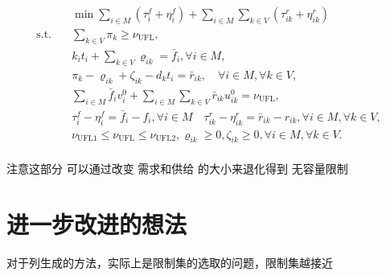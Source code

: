 \documentclass[UTF8]{article}
\begin{document}
\begin{equation}
\begin{aligned}
&\min \sum_{i \in M} \left(\tau_{i}^{f}+\eta_{i}^{f}\right)+\sum_{i \in M} \sum_{k \in V} \left(\tau_{i k}^r+\eta_{i k}^{r}\right) \\
\text{s.t.} \quad &\sum_{k \in V} \pi_{k} \geq \nu_{\mathrm{UFL}}, \\
&k_it_i+\sum_{k \in V} \varrho_{i k}=\bar{f}_{i}, \forall i \in M, \\
&\pi_{k}-\varrho_{i k}+\zeta_{i k}-d_kt_i=\bar{r}_{i k}, \quad \forall i \in M, \forall k \in V, \\
&\sum_{i \in M} \bar{f}_{i} v_{i}^{0}+\sum_{i \in M} \sum_{k \in V} \bar{r}_{i k} u_{i k}^{0}=\nu_{\mathrm{UFL}}, \\
& \tau_{i}^{f}-\eta_{i}^{f}=\bar{f}_{i}-f_{i}, \forall i \in M \quad \tau_{i k}^{r}-\eta_{i k}^{r}=\bar{r}_{i k}-r_{i k}, \forall i \in M, \forall k \in V, \\
&\nu_{\mathrm{UFL} 1} \leq \nu_{\mathrm{UFL}} \leq \nu_{\mathrm{UFL} 2}, \varrho_{i k} \geq 0, \zeta_{i k} \geq 0, \forall i \in M, \forall k \in V. \\
\end{aligned}
\end{equation}

注意这部分 可以通过改变 需求和供给 的大小来退化得到 无容量限制

\section{进一步改进的想法}
对于列生成的方法，实际上是限制集的选取的问题，限制集越接近
\end{document}
